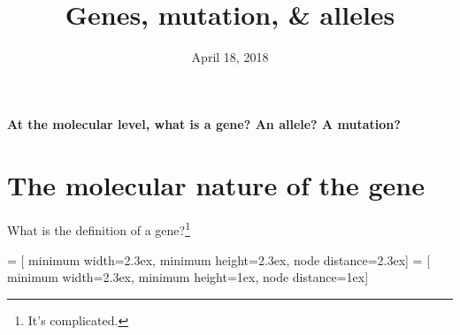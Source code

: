 



% 

\title[Genes, mutation, \& alleles]{Genes, mutation, \& alleles}
\date{April 18, 2018}



\maketitle

\begin{frame}
\textbf{At the molecular level, what is a gene? An allele? A mutation?} \\
\end{frame}

\section{The molecular nature of the gene}

\begin{frame}[t]

    {\Large What is the definition of a gene?}\footnote{\tiny It's complicated.}


\end{frame}

 = [
    minimum width=2.3ex, minimum height=2.3ex, node distance=2.3ex]
 = [
    minimum width=2.3ex, minimum height=1ex, node distance=1ex]

